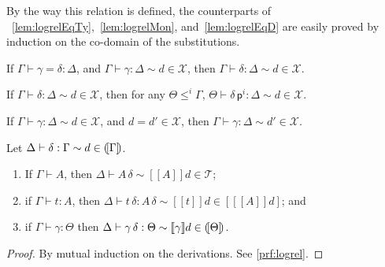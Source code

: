 \documentclass{LMCS}
\theoremstyle{plain}\newtheorem{satz}[thm]{Satz}
\newcommand{\LONGVERSION}[1]{#1}
\newcommand{\SHORTVERSION}[1]{}
\newcommand{\subsc}[2]{#1\,#2}
\newcommand{\subsTm}[2]{#1\,#2}
\newcommand{\subsTy}[2]{#1\,#2}
\newcommand{\p}{\mathsf{p}}
\newcommand{\dtype}[2]{#1\vdash#2}
\newcommand{\dterm}[3]{#1\vdash#3:#2}
\newcommand{\dsubs}[3]{#1\vdash#3:#2}
\newcommand{\deqsubs}[4]{#1\vdash #3=#4: #2}
\newcommand{\calX}{\mathcal{X}}
\newcommand{\perT}{\mathcal{T}}
\newcommand{\semc}[1]{[\![#1]\!]}
\newcommand{\rel}{\sim}
\newcommand{\LONGVERSION}[1]{}
\newcommand{\SHORTVERSION}[1]{#1}
\newcommand{\LONGSHORT}[2]{\LONGVERSION{#1}\SHORTVERSION{#2}}
\begin{document}
\LONGSHORT{

\noindent By the way this relation is defined, the counterparts of
~\ref{lem:logrelEqTy},~\ref{lem:logrelMon}, and~\ref{lem:logrelEqD} are
easily proved by induction on the co-domain of the substitutions.

\begin{rem}
  \label{lem:logrelEqSub}
  If $\deqsubs{\Gamma }{\Delta}{\gamma}{\delta}$, and $\dsubs{\Gamma
  }{\Delta}{\gamma} \rel d \in \calX$, then $\dsubs{\Gamma
  }{\Delta}{\delta}\rel d \in \calX $.
\end{rem}
\begin{rem}
  \label{lem:monsubs}
  If $\dsubs{\Gamma}{\Delta}{\delta} \rel d \in \calX$, then
  for any $\Theta\leqslant^i\Gamma$,
  $\dsubs{\Theta}{\Delta}{\subsc{\delta}{\p^i}} \rel d \in
  \calX$.
\end{rem}
\begin{rem}
  \label{lem:logrelSubEqD}
  If $\dsubs{\Gamma }{\Delta }{\gamma}\rel d\in \calX $, and $d = d' \in
  \calX$, then $\dsubs{\Gamma }{\Delta }{\gamma} \rel d' \in \calX$.
\end{rem}
}{
  After proving the counterparts of \ref{lem:logrelEqTy},
  \ref{lem:logrelMon} and \ref{lem:logrelEqD} for substitutions, we
  can proceed with the proof of the main theorem of logical relations.
}

\begin{thm}
  \label{thm:logrel}
  Let $\dsubs{\Delta}{\Gamma}{\delta}\rel d\in \semctx{\Gamma}$.
  \begin{enumerate}[\em(1)]
  \item If $\dtype{\Gamma}{A}$, then
    $\dtype{\Delta}{\subsTy{A}{\delta}}\rel \semc{A}{d}\in \perT$;
  \item if $\dterm{\Gamma}{A}{t}$, then
    $\dterm{\Delta}{\subsTy{A}{\delta}}{\subsTm{t}{\delta}} \rel
    \semc{t}{d} \in [\semc{A}{d}]$; and
  \item if $\dsubs{\Gamma}{\Theta}{\gamma}$ then
    $\dsubs{\Delta}{\Theta}{\subsc{\gamma}{\delta}} \rel
    \semc{\gamma}{d} \in \semctx{\Theta}$.
  \end{enumerate}
\end{thm}
\LONGVERSION{
\begin{proof}By mutual induction on the derivations. See \ref{prf:logrel}.
\end{proof}
}
\end{document}

